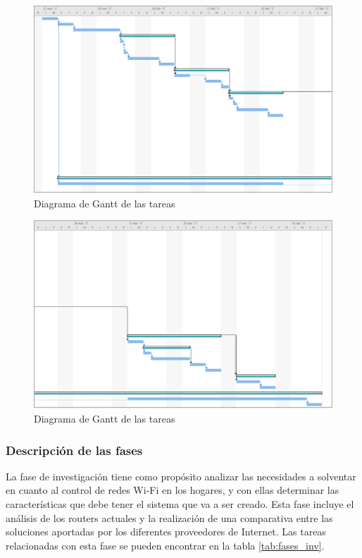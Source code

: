 \documentclass[12pt]{article}
\begin{document}
        \begin{figure}[h!]
            \centering
                \includegraphics[scale=0.5]{tasks_gantt0.eps}
                \caption{Diagrama de Gantt de las tareas}
                \label{fig:tasks_gantt0}
        \end{figure}

        \begin{figure}[h!]
            \centering
                \includegraphics[scale=0.5]{tasks_gantt1.eps}
                \caption{Diagrama de Gantt de las tareas}
                \label{fig:tasks_gantt1}
        \end{figure}

        \subsubsection{Descripción de las fases}
            La fase de investigación tiene como propósito analizar las necesidades a solventar en cuanto al control de redes Wi-Fi en los hogares, y con ellas determinar las características que debe tener el sistema que va a ser creado. Esta fase incluye el análisis de los routers actuales y la realización de una comparativa entre las soluciones aportadas por los diferentes proveedores de Internet. Las tareas relacionadas con esta fase se pueden encontrar en la tabla \ref{tab:fases_inv}.
\end{document}
